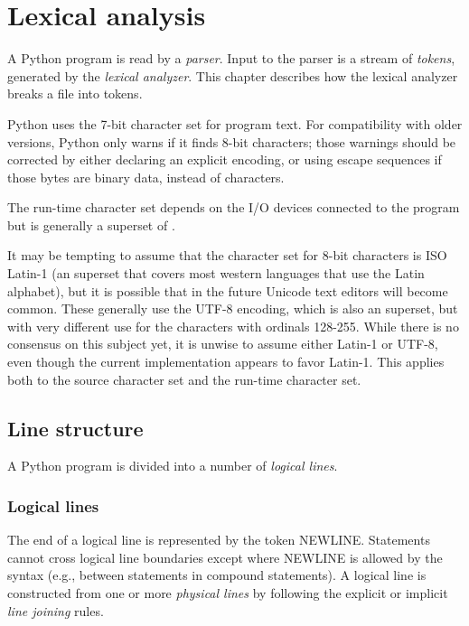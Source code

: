 \chapter{Lexical analysis\label{lexical}}

A Python program is read by a \emph{parser}.  Input to the parser is a
stream of \emph{tokens}, generated by the \emph{lexical analyzer}.  This
chapter describes how the lexical analyzer breaks a file into tokens.

Python uses the 7-bit \ASCII{} character set for program text.
For compatibility with older versions, Python only warns if it finds
8-bit characters; those warnings should be corrected by either declaring
an explicit encoding, or using escape sequences if those bytes are binary
data, instead of characters.


The run-time character set depends on the I/O devices connected to the
program but is generally a superset of \ASCII.

 It may be tempting to assume that the
character set for 8-bit characters is ISO Latin-1 (an \ASCII{}
superset that covers most western languages that use the Latin
alphabet), but it is possible that in the future Unicode text editors
will become common.  These generally use the UTF-8 encoding, which is
also an \ASCII{} superset, but with very different use for the
characters with ordinals 128-255.  While there is no consensus on this
subject yet, it is unwise to assume either Latin-1 or UTF-8, even
though the current implementation appears to favor Latin-1.  This
applies both to the source character set and the run-time character
set.


\section{Line structure\label{line-structure}}

A Python program is divided into a number of \emph{logical lines}.


\subsection{Logical lines\label{logical}}

The end of
a logical line is represented by the token NEWLINE.  Statements cannot
cross logical line boundaries except where NEWLINE is allowed by the
syntax (e.g., between statements in compound statements).
A logical line is constructed from one or more \emph{physical lines}
by following the explicit or implicit \emph{line joining} rules.


